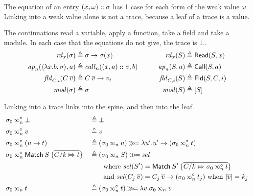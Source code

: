 The equation of an entry $(x,\omega)::\sigma$ has 1 case for each form of the weak value $\omega$.
Linking into a weak value alone is not a trace, because a leaf of a trace is a value.

The continuations read a variable, apply a function, take a field and take a module.
In each case that the equations do not give, the trace is $\bot$.
\begin{alignat*}{2}
  \rdf{x}(\sigma)                               & \triangleq\guardt{\sigma}{\sigma(x)}                 & \qquad \rdf{x}(S)       & \triangleq\ReadE(S,x)   \\
  \apf{n}(\langle\lambda x.b,\sigma\rangle,a)   & \triangleq\callt{n}((x,a)\cons\sigma,b)              & \qquad \apf{n}(S,a)     & \triangleq\CallE(S,a)   \\
  \fldf{C}{i}(C\:\overline{v})                  & \triangleq\guardt{C\:\overline{v}}{v_i}              & \qquad \fldf{C}{i}(S)   & \triangleq\FldE(S,C,i)  \\
  \modf(\sigma)                                 & \triangleq\sigma                                     & \qquad \modf(S)         & \triangleq[S]
\end{alignat*}

Linking into a trace links into the spine, and then into the leaf.
\begin{alignat*}{2}
  \sigma_0\splk{n}{} & \bot                               &  & \triangleq\bot                                                                           \\
  \sigma_0\splk{n}{} & v                                  &  & \triangleq v                                                                             \\
  \sigma_0\splk{n}{} & (\guardt{u}{t})                    &  & \triangleq(\sigma_0\lk{n}u)\bindt\lambda u'.\guardt{u'}{(\sigma_0\splk{n}t)}              \\
  \sigma_0\splk{n}{} & \MatchT\:S\:\{\overline{C/k\Mapsto t}\} &  & \triangleq(\sigma_0\lk{n}S)\bindt\mathit{sel}                                          \\
                     &                                    &  & \qquad\text{where }\mathit{sel}(S')=\MatchT\:S'\:\{\overline{C/k\Mapsto\sigma_0\splk{n}t}\} \\
                     &                                    &  & \qquad\text{and }\mathit{sel}(C_j\:\overline{v})=\guardt{C_j\:\overline{v}}{(\sigma_0\splk{n}t_j)}\text{ when }|\overline{v}|=k_j \\
  \sigma_0\lk{n}{}   & t                                  &  & \triangleq(\sigma_0\splk{n}t)\bindt\lambda v.\sigma_0\lk{n}v
\end{alignat*}

